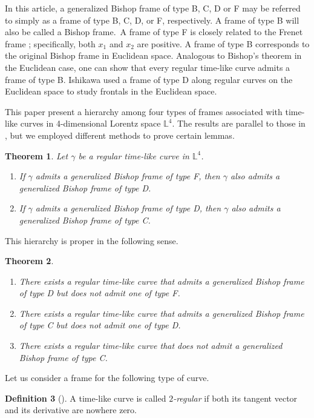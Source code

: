\documentclass[a4paper]{amsart}
\newtheorem{theorem}{Theorem}[section]
\theoremstyle{definition}
\newtheorem{definition}[theorem]{Definition}
\theoremstyle{remark}
\newcommand{\LL}{\mathbb{L}}
\numberwithin{equation}{section}
\begin{document}
In this article, a generalized Bishop frame of type B, C, D or F may be referred to simply as a frame of type B, C, D, or F, respectively. A frame of type B will  also be called a Bishop frame.
\,A frame of type F is closely related to the Frenet frame ; specifically, both $x_1$ and $x_2$ are positive.
A frame of type B corresponds to the original Bishop frame in Euclidean space. Analogous to Bishop's theorem in the Euclidean case, one can show that every regular time-like curve admits a frame of type B. Ishikawa \cite{GI} used a frame of type D along regular curves on the Euclidean space to study frontals in the Euclidean space. 

This paper present a hierarchy among four types of frames associated with time-like curves in 4-dimensional Lorentz space $\LL^{4}$. The results are parallel to those in \cite{NN}, but we employed different methods to prove certain lemmas.
\begin{theorem}\label{thm:hier}
Let $\gamma$ be a regular time-like curve in $\LL^4$.
\begin{enumerate}
    \item If $\gamma$ admits a generalized Bishop frame of type F, then $\gamma$ also admits a generalized Bishop frame of type D. 
    \item If $\gamma$ admits a generalized Bishop frame of type D, then $\gamma$ also admits a generalized Bishop frame of type C.  
\end{enumerate}
\end{theorem}
This hierarchy is proper in the following sense. 
\begin{theorem}\label{thm:noCD}
\begin{enumerate}
    \item There exists a regular time-like curve that admits a generalized Bishop frame of type D but does not admit one of type F. 
    \item There exists a regular time-like curve that admits a generalized Bishop frame of type C but does not admit one of type D. 
    \item There exists a regular time-like curve that does not admit a generalized Bishop frame of type C.
\end{enumerate}
\end{theorem}

Let us consider a frame for the following type of curve.
\begin{definition}[{\cite{NN}}]
A time-like curve is called \emph{$2$-regular} if both its tangent vector and its derivative are nowhere zero. 
\end{definition}
\end{document}
